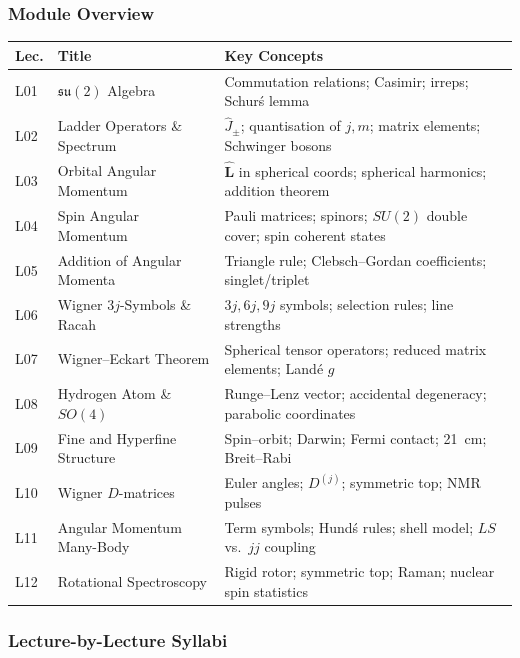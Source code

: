 \documentclass[11pt,a4paper]{article}
\begin{document}
\subsubsection*{Module Overview}

{\footnotesize
\begin{center}
\begin{tabular}{@{}lp{4.2cm}p{6.8cm}@{}}
\toprule
\textbf{Lec.} & \textbf{Title} & \textbf{Key Concepts}\\
\midrule
L01 & $\mathfrak{su}(2)$ Algebra & Commutation relations; Casimir; irreps; Schur\'s lemma\\
L02 & Ladder Operators \& Spectrum & $\hat{J}_\pm$; quantisation of $j,m$; matrix elements; Schwinger bosons\\
L03 & Orbital Angular Momentum & $\hat{\mathbf{L}}$ in spherical coords; spherical harmonics; addition theorem\\
L04 & Spin Angular Momentum & Pauli matrices; spinors; $SU(2)$ double cover; spin coherent states\\
L05 & Addition of Angular Momenta & Triangle rule; Clebsch--Gordan coefficients; singlet/triplet\\
L06 & Wigner $3j$-Symbols \& Racah & $3j,6j,9j$ symbols; selection rules; line strengths\\
\midrule
L07 & Wigner--Eckart Theorem & Spherical tensor operators; reduced matrix elements; Land\'e $g$\\
L08 & Hydrogen Atom \& $SO(4)$ & Runge--Lenz vector; accidental degeneracy; parabolic coordinates\\
L09 & Fine and Hyperfine Structure & Spin--orbit; Darwin; Fermi contact; 21~cm; Breit--Rabi\\
L10 & Wigner $D$-matrices & Euler angles; $D^{(j)}$; symmetric top; NMR pulses\\
L11 & Angular Momentum Many-Body & Term symbols; Hund\'s rules; shell model; $LS$ vs.\ $jj$ coupling\\
L12 & Rotational Spectroscopy & Rigid rotor; symmetric top; Raman; nuclear spin statistics\\
\bottomrule
\end{tabular}
\end{center}
}

\subsubsection*{Lecture-by-Lecture Syllabi}
\end{document}
